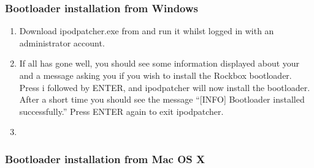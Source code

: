 \subsubsection{Bootloader installation from Windows}

\begin{enumerate}

\item Download ipodpatcher.exe from
and run it whilst logged in with an administrator account.

\item If all has gone well, you should see some information displayed about
your \dap{} and a message asking you if you wish to install the Rockbox
bootloader. Press i followed by ENTER, and ipodpatcher will now
install the bootloader. After a short time you should see the message
``[INFO] Bootloader installed successfully.'' Press ENTER again to exit
ipodpatcher.

\item {}

\end{enumerate}

\subsubsection{Bootloader installation from Mac OS X}

